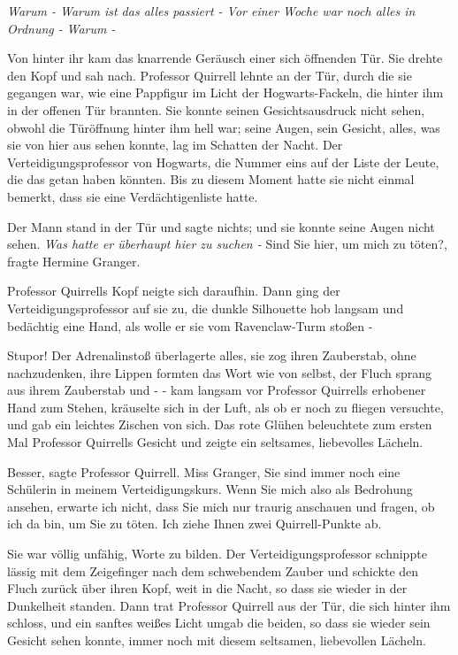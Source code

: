 \emph{Warum - Warum ist das alles passiert - Vor einer Woche war noch alles in
Ordnung -} \emph{Warum -}

Von hinter ihr kam das knarrende Geräusch einer sich öffnenden Tür. Sie drehte
den Kopf und sah nach. Professor Quirrell lehnte an der Tür, durch die sie
gegangen war, wie eine Pappfigur im Licht der Hogwarts-Fackeln, die hinter ihm
in der offenen Tür brannten. Sie konnte seinen Gesichtsausdruck nicht sehen,
obwohl die Türöffnung hinter ihm hell war; seine Augen, sein Gesicht, alles, was
sie von hier aus sehen konnte, lag im Schatten der Nacht. Der
Verteidigungsprofessor von Hogwarts, die Nummer eins auf der Liste der Leute,
die das getan haben könnten. Bis zu diesem Moment hatte sie nicht einmal
bemerkt, dass sie eine Verdächtigenliste hatte.

Der Mann stand in der Tür und sagte nichts; und sie konnte seine Augen nicht
sehen. \emph{Was hatte er überhaupt hier zu suchen -} \glqq{}Sind Sie hier, um
mich zu töten?\grqq{}, fragte Hermine Granger.

Professor Quirrells Kopf neigte sich daraufhin. Dann ging der
Verteidigungsprofessor auf sie zu, die dunkle Silhouette hob langsam und
bedächtig eine Hand, als wolle er sie vom Ravenclaw-Turm stoßen -

\glqq{}Stupor!\grqq{} Der Adrenalinstoß überlagerte alles, sie zog ihren
Zauberstab, ohne nachzudenken, ihre Lippen formten das Wort wie von selbst, der
Fluch sprang aus ihrem Zauberstab und - - kam langsam vor Professor Quirrells
erhobener Hand zum Stehen, kräuselte sich in der Luft, als ob er noch zu fliegen
versuchte, und gab ein leichtes Zischen von sich. Das rote Glühen beleuchtete
zum ersten Mal Professor Quirrells Gesicht und zeigte ein seltsames, liebevolles
Lächeln.

\glqq{}Besser\grqq{}, sagte Professor Quirrell. \glqq{}Miss Granger, Sie sind
immer noch eine Schülerin in meinem Verteidigungskurs. Wenn Sie mich also als
Bedrohung ansehen, erwarte ich nicht, dass Sie mich nur traurig anschauen und
fragen, ob ich da bin, um Sie zu töten. Ich ziehe Ihnen zwei Quirrell-Punkte
ab.\grqq{}

Sie war völlig unfähig, Worte zu bilden. Der Verteidigungsprofessor schnippte
lässig mit dem Zeigefinger nach dem schwebendem Zauber und schickte den Fluch
zurück über ihren Kopf, weit in die Nacht, so dass sie wieder in der Dunkelheit
standen. Dann trat Professor Quirrell aus der Tür, die sich hinter ihm schloss,
und ein sanftes weißes Licht umgab die beiden, so dass sie wieder sein Gesicht
sehen konnte, immer noch mit diesem seltsamen, liebevollen Lächeln.

